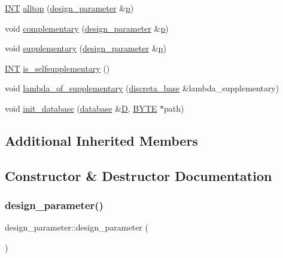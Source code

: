 \begin{DoxyCompactItemize}
\item 
\mbox{\hyperlink{galois_8h_a09fddde158a3a20bd2dcadb609de11dc}{I\+NT}} \mbox{\hyperlink{classdesign__parameter_ac91d8a483974702c826889aade83cd5f}{alltop}} (\mbox{\hyperlink{classdesign__parameter}{design\+\_\+parameter}} \&\mbox{\hyperlink{alphabet2_8_c_a533391314665d6bf1b5575e9a9cd8552}{p}})
\item 
void \mbox{\hyperlink{classdesign__parameter_a9025f18483dfe3f57eecfc6a603b7df1}{complementary}} (\mbox{\hyperlink{classdesign__parameter}{design\+\_\+parameter}} \&\mbox{\hyperlink{alphabet2_8_c_a533391314665d6bf1b5575e9a9cd8552}{p}})
\item 
void \mbox{\hyperlink{classdesign__parameter_a92bc4ea249ac3cdedbf77566410acd5a}{supplementary}} (\mbox{\hyperlink{classdesign__parameter}{design\+\_\+parameter}} \&\mbox{\hyperlink{alphabet2_8_c_a533391314665d6bf1b5575e9a9cd8552}{p}})
\item 
\mbox{\hyperlink{galois_8h_a09fddde158a3a20bd2dcadb609de11dc}{I\+NT}} \mbox{\hyperlink{classdesign__parameter_ac0ad1bf4fb71b9eab055d18503c4a7ce}{is\+\_\+selfsupplementary}} ()
\item 
void \mbox{\hyperlink{classdesign__parameter_a377c987a2c470225466fd32a3e920f0a}{lambda\+\_\+of\+\_\+supplementary}} (\mbox{\hyperlink{classdiscreta__base}{discreta\+\_\+base}} \&lambda\+\_\+supplementary)
\item 
void \mbox{\hyperlink{classdesign__parameter_abe95966fa2ed15d9bad7cac2476d4683}{init\+\_\+database}} (\mbox{\hyperlink{classdatabase}{database}} \&\mbox{\hyperlink{costas_8_c_af13967e8da5ae214c112fd612639beaa}{D}}, \mbox{\hyperlink{galois_8h_ab6cc7b4aeb6ea31aba2b3fbfc83ff5e6}{B\+Y\+TE}} $\ast$path)
\end{DoxyCompactItemize}
\subsection*{Additional Inherited Members}


\subsection{Constructor \& Destructor Documentation}
\mbox{\label{classdesign__parameter_a1952bb71b52e00bcb579d3eafd809f05}} 
\subsubsection{\texorpdfstring{design\+\_\+parameter()}{design\_parameter()}\hspace{0.1cm}{\footnotesize\ttfamily [1/2]}}
{\footnotesize\ttfamily design\+\_\+parameter\+::design\+\_\+parameter (\begin{DoxyParamCaption}{ }\end{DoxyParamCaption})}

